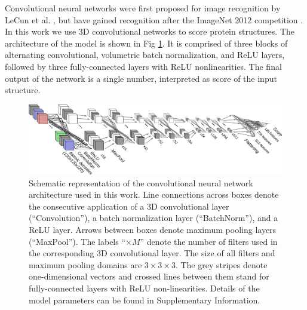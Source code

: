 Convolutional neural networks were first proposed for image
recognition by LeCun et al. \cite{lecun1989backpropagation}, but have
gained recognition after the ImageNet 2012
competition \cite{krizhevsky2012imagenet}.  In this work we use 3D
convolutional networks to score protein structures. The architecture
of the model is shown in Fig \ref{Fig:CNNModel}.  It is comprised of
three blocks of alternating convolutional, volumetric batch
normalization, and ReLU layers, followed by three fully-connected
layers with ReLU nonlinearities. The final output of the network is a
single number, interpreted as  score of the input structure.

\begin{figure}[H]
    \centering
    \includegraphics[width=\linewidth]{Fig/ConvnetDiagramV1.png}

    \caption{Schematic representation of the convolutional neural
    network architecture used in this work.  Line connections across
    boxes denote the consecutive application of a 3D convolutional
    layer (``Convolution''), a batch normalization layer
    (``BatchNorm''), and a ReLU layer. Arrows between boxes denote
    maximum pooling layers (``MaxPool''). The labels ``$\times M$''
    denote the number of filters used in the corresponding 3D
    convolutional layer. The size of all filters and maximum pooling
    domains are $3\times 3\times 3$. The grey stripes denote
    one-dimensional vectors and crossed lines between them stand for
    fully-connected layers with ReLU non-linearities. Details of the
    model parameters can be found in Supplementary Information.}

    \label{Fig:CNNModel}
\end{figure}

